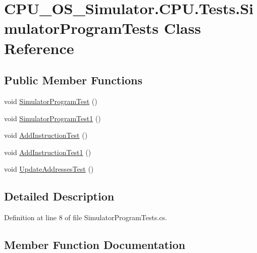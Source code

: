 \hypertarget{class_c_p_u___o_s___simulator_1_1_c_p_u_1_1_tests_1_1_simulator_program_tests}{}\section{C\+P\+U\+\_\+\+O\+S\+\_\+\+Simulator.\+C\+P\+U.\+Tests.\+Simulator\+Program\+Tests Class Reference}
\label{class_c_p_u___o_s___simulator_1_1_c_p_u_1_1_tests_1_1_simulator_program_tests}
\subsection*{Public Member Functions}
\begin{DoxyCompactItemize}
\item 
void \hyperlink{class_c_p_u___o_s___simulator_1_1_c_p_u_1_1_tests_1_1_simulator_program_tests_a86776e466d36e5138765fdf648211fc7}{Simulator\+Program\+Test} ()
\item 
void \hyperlink{class_c_p_u___o_s___simulator_1_1_c_p_u_1_1_tests_1_1_simulator_program_tests_a4bc06b230e557ec3bb036e33bea4b59a}{Simulator\+Program\+Test1} ()
\item 
void \hyperlink{class_c_p_u___o_s___simulator_1_1_c_p_u_1_1_tests_1_1_simulator_program_tests_a0abe728005b8d75576cc7cb5bac436c0}{Add\+Instruction\+Test} ()
\item 
void \hyperlink{class_c_p_u___o_s___simulator_1_1_c_p_u_1_1_tests_1_1_simulator_program_tests_ad708220fd97704b0807b1dfcbbfff6ad}{Add\+Instruction\+Test1} ()
\item 
void \hyperlink{class_c_p_u___o_s___simulator_1_1_c_p_u_1_1_tests_1_1_simulator_program_tests_a21f054ad89eae1b93628e9ea94a32092}{Update\+Addresses\+Test} ()
\end{DoxyCompactItemize}


\subsection{Detailed Description}


Definition at line 8 of file Simulator\+Program\+Tests.\+cs.



\subsection{Member Function Documentation}
\hypertarget{class_c_p_u___o_s___simulator_1_1_c_p_u_1_1_tests_1_1_simulator_program_tests_a0abe728005b8d75576cc7cb5bac436c0}{}

